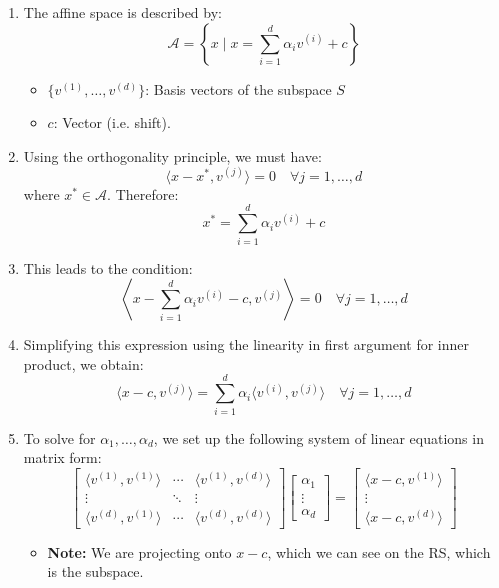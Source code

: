 \begin{derivation}
    \begin{enumerate}
        \item The affine space is described by:
        \[
        \mathcal{A} = \left\{ x \mid x = \sum_{i=1}^{d} \alpha_i v^{(i)} + c \right\}
        \]
        \begin{itemize}
            \item $\{v^{(1)}, \dots, v^{(d)}\}$: Basis vectors of the subspace $S$
            \item $c$: Vector (i.e. shift).
        \end{itemize}
    
        \item Using the orthogonality principle, we must have:
        \[
        \langle x - x^*, v^{(j)} \rangle = 0 \quad \forall j = 1, \dots, d
        \]
        where $x^* \in \mathcal{A}$. Therefore:
        \[
        x^* = \sum_{i=1}^{d} \alpha_i v^{(i)} + c
        \]
    
        \item This leads to the condition:
        \[
        \left\langle x - \sum_{i=1}^{d} \alpha_i v^{(i)} - c, v^{(j)} \right\rangle = 0 \quad \forall j = 1, \dots, d
        \]
    
        \item Simplifying this expression using the linearity in first argument for inner product, we obtain:
        \[
        \langle x - c, v^{(j)} \rangle = \sum_{i=1}^{d} \alpha_i \langle v^{(i)}, v^{(j)} \rangle \quad \forall j = 1, \dots, d
        \]
    
        \item To solve for $\alpha_1, \dots, \alpha_d$, we set up the following system of linear equations in matrix form:
        \[
        \begin{bmatrix}
        \langle v^{(1)}, v^{(1)} \rangle & \cdots & \langle v^{(1)}, v^{(d)} \rangle \\
        \vdots & \ddots & \vdots \\
        \langle v^{(d)}, v^{(1)} \rangle & \cdots & \langle v^{(d)}, v^{(d)} \rangle
        \end{bmatrix}
        \begin{bmatrix}
        \alpha_1 \\
        \vdots \\
        \alpha_d
        \end{bmatrix}
        =
        \begin{bmatrix}
        \langle x - c, v^{(1)} \rangle \\
        \vdots \\
        \langle x - c, v^{(d)} \rangle
        \end{bmatrix}
        \]
        \begin{itemize}
            \item \textbf{Note:} We are projecting onto $x-c$, which we can see on the RS, which is the subspace.
        \end{itemize}
    

\end{enumerate}
\end{derivation}
